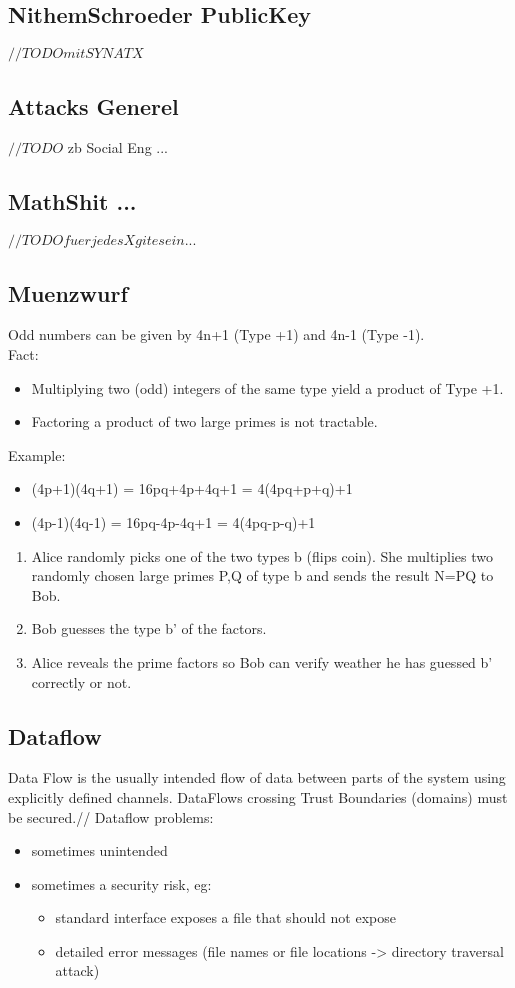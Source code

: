 \documentclass[a4paper, 12pt]{article}
\begin{document}
\subsection{NithemSchroeder PublicKey}
$ //TODO mit SYNATX $
\subsection{Attacks Generel}
$ //TODO $
zb Social Eng ...
\subsection{MathShit ...}
$ //TODO fuer jedes X git es ein ... $
\subsection{Muenzwurf}
Odd numbers can be given by 4n+1 (Type +1) and 4n-1 (Type -1).\\
Fact:
\begin{itemize}
\item Multiplying two (odd) integers of the same type yield a product of Type +1.
\item Factoring a product of two large primes is not tractable.
\end{itemize}
Example:
\begin{itemize}
\item (4p+1)(4q+1) = 16pq+4p+4q+1 = 4(4pq+p+q)+1
\item (4p-1)(4q-1) = 16pq-4p-4q+1 = 4(4pq-p-q)+1
\end{itemize}
\begin{enumerate}
\item Alice randomly picks one of the two types b (flips coin). She multiplies two randomly chosen large primes P,Q of type b and sends the result N=PQ to Bob.\\
\item Bob guesses the type b' of the factors.\\
\item Alice reveals the prime factors so Bob can verify weather he has guessed b' correctly or not.
\end{enumerate}

\subsection{Dataflow}
Data Flow is the usually intended flow of data between parts of the system using explicitly defined channels. DataFlows crossing Trust Boundaries (domains) must be secured.//
Dataflow problems:
\begin{itemize}
\item sometimes unintended
\item sometimes a security risk, eg:
\begin{itemize}
\item standard interface exposes a file that should not expose
\item detailed error messages (file names or file locations -> directory traversal attack)
\end{itemize} 
\end{itemize}
\end{document}
